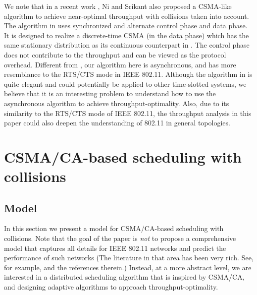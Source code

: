\documentclass{IEEEtran}
\begin{document}
We note that in a recent work \cite{Jian}, Ni and Srikant also proposed
a CSMA-like algorithm to achieve near-optimal throughput with collisions
taken into account. The algorithm in \cite{Jian} uses synchronized
and alternate control phase and data phase. It is designed to realize
a discrete-time CSMA (in the data phase) which has the same stationary
distribution as its continuous counterpart in \cite{Allerton}. The
control phase does not contribute to the throughput and can be viewed
as the protocol overhead. Different from \cite{Jian}, our algorithm
here is asynchronous, and has more resemblance to the RTS/CTS mode
in IEEE 802.11. Although the algorithm in \cite{Jian} is quite elegant
and could potentially be applied to other time-slotted systems, we
believe that it is an interesting problem to understand how to use
the asynchronous algorithm to achieve throughput-optimality. Also,
due to its similarity to the RTS/CTS mode of IEEE 802.11, the throughput
analysis in this paper could also deepen the understanding of 802.11
in general topologies.


\section{\label{sec:formula}CSMA/CA-based scheduling with collisions}


\subsection{Model}

In this section we present a model for CSMA/CA-based scheduling with
collisions. Note that the goal of the paper is \emph{not} to propose
a comprehensive model that captures all details for IEEE 802.11 networks
and predict the performance of such networks (The literature in that
area has been very rich. See, for example, \cite{new_insight,Kar}
and the references therein.) Instead, at a more abstract level, we
are interested in a distributed scheduling algorithm that is inspired
by CSMA/CA, and designing adaptive algorithms to approach throughput-optimality.
\begin{comment}
Such algorithms can be used not only in wireless networks, but also
in a general task processing problem.


\subsubsection{A model in the context of CSMA/CA wireless networks}
\end{comment}
{}
\end{document}
